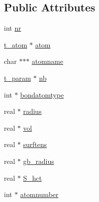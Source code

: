 \subsection*{\-Public \-Attributes}
\begin{DoxyCompactItemize}
\item 
int \hyperlink{structgpp__atomtype_ab8b30563c4371f14e7853178454308e3}{nr}
\item 
\hyperlink{structt__atom}{t\-\_\-atom} $\ast$ \hyperlink{structgpp__atomtype_a8d895cc22e3ec26491b790506156fd00}{atom}
\item 
char $\ast$$\ast$$\ast$ \hyperlink{structgpp__atomtype_ae57b1f0b8cb12a1e29bc6bf12581c513}{atomname}
\item 
\hyperlink{structt__param}{t\-\_\-param} $\ast$ \hyperlink{structgpp__atomtype_ab88cd9092ea5995b7f8b497b12da6aae}{nb}
\item 
int $\ast$ \hyperlink{structgpp__atomtype_a0aa2285f55ff4ec5e83472793599dec1}{bondatomtype}
\item 
real $\ast$ \hyperlink{structgpp__atomtype_a1357ea84a180da89f85a6f85ba424819}{radius}
\item 
real $\ast$ \hyperlink{structgpp__atomtype_a03c8966807be6989d11caa3be503bf47}{vol}
\item 
real $\ast$ \hyperlink{structgpp__atomtype_a98a8c474d8c73721fa44705fefdd77b6}{surftens}
\item 
real $\ast$ \hyperlink{structgpp__atomtype_ab65fd20f1bb906e269d41dabac02ec53}{gb\-\_\-radius}
\item 
real $\ast$ \hyperlink{structgpp__atomtype_ae8162419cbd224a1a75ca5b44986680e}{\-S\-\_\-hct}
\item 
int $\ast$ \hyperlink{structgpp__atomtype_af05cc2cfbbd4462ff5205d1614663113}{atomnumber}
\end{DoxyCompactItemize}


